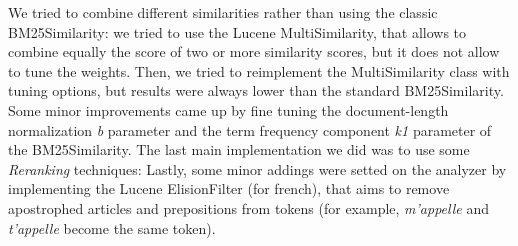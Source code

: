 We tried to combine different similarities rather than using the classic BM25Similarity: we tried to use the Lucene MultiSimilarity, that allows to combine equally the score of two or more similarity scores, but it does not allow to
tune the weights. Then, we tried to reimplement the MultiSimilarity class with tuning options, but results were always lower than the standard BM25Similarity. Some minor improvements came up by fine tuning the document-length
normalization \textit{b} parameter and the term frequency component \textit{k1} parameter of the BM25Similarity.
The last main implementation we did was to use some \textit{Reranking} techniques:  
Lastly, some minor addings were setted on the analyzer by implementing the Lucene ElisionFilter (for french), that aims to remove apostrophed articles and prepositions from tokens (for example, \textit{m'appelle} and \textit{t'appelle} become the same token).


